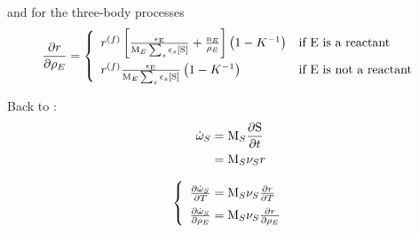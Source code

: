 and for the three-body processes
\begin{equation}
\renewcommand{\arraystretch}{1.5}
\doverdm[E]{\rate} = \left\{\begin{array}{ll}
                        \fwdrate \left[\frac{\epsilon_{\ce{E}}}{\Mm[E]\threeBody} + \frac{\scoefabs[E]}{\mass[E]} \right] \left(1 - \Eqconst^{-1}\right)
                                                & \text{if \ce{E} is a reactant} \\
                        \fwdrate \frac{\epsilon_{\ce{E}}}{\Mm[E]\threeBody}  \left(1 - \Eqconst^{-1}\right)
                                                & \text{if \ce{E} is not a reactant} \\
                      \end{array}\right.
\end{equation}

Back to \mdot:
\begin{equation}
\begin{split}
\mdot[S] &= \Mm[S] \doverdt{\ce{S}} \\
         &= \Mm[S] \scoef[S]\rate
\end{split}
\end{equation}

\begin{equation}
\renewcommand{\arraystretch}{1.5}
\left\{\begin{array}{l}
\doverdT{\mdot[S]} = \Mm[S] \scoef[S]\doverdT{\rate}\\
\doverdm[E]{\mdot[S]} = \Mm[S] \scoef[S]\doverdm[E]{\rate}
\end{array}\right.
\end{equation}

